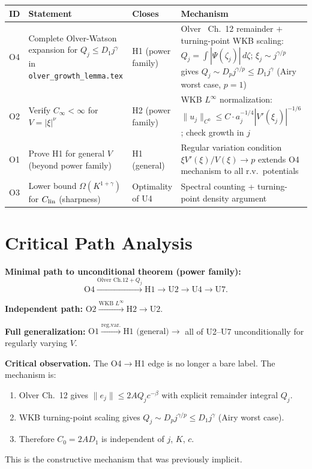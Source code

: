 \documentclass[12pt,a4paper]{amsart}
\theoremstyle{definition}
\begin{document}
\begin{center}
\renewcommand{\arraystretch}{1.3}
\begin{tabular}{l p{4.0cm} l p{4.5cm}}
\toprule
\textbf{ID} & \textbf{Statement} & \textbf{Closes} & \textbf{Mechanism} \\
\midrule
O4 & Complete Olver-Watson
  expansion for $Q_j\leq D_1 j^\gamma$
  in \texttt{olver\_growth\_lemma.tex}
  & H1 (power family)
  & Olver~\cite{Olver1997} Ch.~12 remainder
    $+$ turning-point WKB scaling:
    $Q_j = \int|\Psi(\zeta_j)|\,d\zeta$;
    $\xi_j\sim j^{\gamma/p}$ gives
    $Q_j\sim D_p j^{\gamma/p}\leq D_1 j^\gamma$
    (Airy worst case, $p=1$) \\
O2 & Verify $C_\infty<\infty$
  for $V=|\xi|^\nu$
  & H2 (power family)
  & WKB $L^\infty$ normalization:
    $\|u_j\|_{C^0}\leq C\cdot a_j^{-1/4}|V'(\xi_j)|^{-1/6}$;
    check growth in $j$ \\
O1 & Prove H1 for general $V$
  (beyond power family)
  & H1 (general)
  & Regular variation condition
    $\xi V'(\xi)/V(\xi)\to p$
    extends O4 mechanism to
    all r.v.\ potentials \\
O3 & Lower bound $\Omega(K^{1+\gamma})$
  for $C_{\rm lin}$ (sharpness)
  & Optimality of U4
  & Spectral counting + turning-point
    density argument \\
\bottomrule
\end{tabular}
\end{center}

\section{Critical Path Analysis}
\label{sec:critical_path}

\textbf{Minimal path to unconditional theorem (power family):}
\[
  \text{O4}\xrightarrow{\text{Olver Ch.12}+Q_j}
  \text{H1}\xrightarrow{}
  \text{U2}\xrightarrow{}
  \text{U4}\xrightarrow{}
  \text{U7}.
\]

\textbf{Independent path:}
$\text{O2}\xrightarrow{\text{WKB }L^\infty}\text{H2}\to\text{U2}$.

\textbf{Full generalization:}
$\text{O1}\xrightarrow{\text{reg.var.}}\text{H1 (general)}\to$
all of U2--U7 unconditionally for regularly varying $V$.

\medskip
\textbf{Critical observation.}
The O4$\to$H1 edge is no longer a bare label.
The mechanism is:
\begin{enumerate}[label=(\roman*),nosep]
  \item Olver Ch.~12 gives $\|e_j\|\leq 2AQ_j c^{-\beta}$
    with explicit remainder integral $Q_j$.
  \item WKB turning-point scaling gives
    $Q_j\sim D_p j^{\gamma/p}\leq D_1 j^\gamma$
    (Airy worst case).
  \item Therefore $C_0 = 2AD_1$ is independent of $j$, $K$, $c$.
\end{enumerate}
This is the constructive mechanism that was previously implicit.
\end{document}
